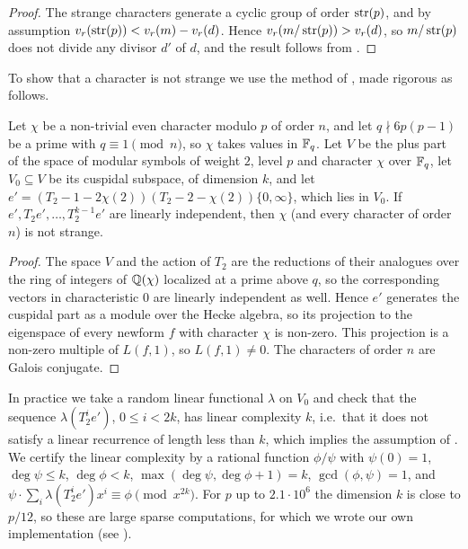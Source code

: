 \begin{proof}
The strange characters generate a cyclic group of order $\operatorname{str}(p)$, and by assumption $v_r(\operatorname{str}(p))<v_r(m)-v_r(d)$. Hence $v_r(m/\operatorname{str}(p))>v_r(d)$, so $m/\operatorname{str}(p)$ does not divide any divisor $d'$ of $d$, and the result follows from .
\end{proof}

To show that a character is not strange we use the method of \cite[Section 5]{DSt}, made rigorous as follows.

\begin{lemma}\label{lem:nonstrange}
Let $\chi$ be a non-trivial even character modulo $p$ of order $n$, and let $q\nmid 6p(p-1)$ be a prime with $q\equiv1\pmod n$, so $\chi$ takes values in $\mathbb{F}_q$. Let $V$ be the plus part of the space of modular symbols of weight $2$, level $p$ and character $\chi$ over $\mathbb{F}_q$, let $V_0\subseteq V$ be its cuspidal subspace, of dimension $k$, and let $e'=(T_2-1-2\chi(2))(T_2-2-\chi(2))\{0,\infty\}$, which lies in $V_0$. If $e',T_2e',\dots,T_2^{k-1}e'$ are linearly independent, then $\chi$ (and every character of order $n$) is not strange.
\end{lemma}

\begin{proof}
The space $V$ and the action of $T_2$ are the reductions of their analogues over the ring of integers of $\mathbb{Q}(\chi)$ localized at a prime above $q$, so the corresponding vectors in characteristic $0$ are linearly independent as well. Hence $e'$ generates the cuspidal part as a module over the Hecke algebra, so its projection to the eigenspace of every newform $f$ with character $\chi$ is non-zero. This projection is a non-zero multiple of $L(f,1)$, so $L(f,1)\neq0$. The characters of order $n$ are Galois conjugate.
\end{proof}

In practice we take a random linear functional $\lambda$ on $V_0$ and check that the sequence $\lambda(T_2^ie')$, $0\leq i<2k$, has linear complexity $k$, i.e.\ that it does not satisfy a linear recurrence of length less than $k$, which implies the assumption of . We certify the linear complexity by a rational function $\phi/\psi$ with $\psi(0)=1$, $\deg\psi\leq k$, $\deg\phi<k$, $\max(\deg\psi,\deg\phi+1)=k$, $\gcd(\phi,\psi)=1$, and $\psi\cdot\sum_i\lambda(T_2^ie')x^i\equiv\phi\pmod{x^{2k}}$. For $p$ up to $2.1\cdot10^6$ the dimension $k$ is close to $p/12$, so these are large sparse computations, for which we wrote our own implementation (see ).

